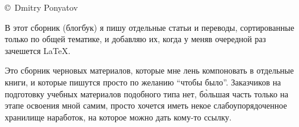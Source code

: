 
\copyright\ Dmitry Ponyatov 
\bigskip

В этот сборник (блогбук) я пишу отдельные статьи и переводы, сортированные
только по общей тематике, и добавляю их, когда у меняв очередной раз зачешется
\LaTeX.

Это сборник черновых материалов, которые мне лень компоновать в отдельные книги,
и которые пишутся просто по желанию ``чтобы было''. Заказчиков на подготовку
учебных материалов подобного типа нет, б\`{о}льшая часть только на этапе
освоения мной самим, просто хочется иметь некое слабоупорядоченное хранилище
наработок, на которое можно дать кому-то ссылку.
